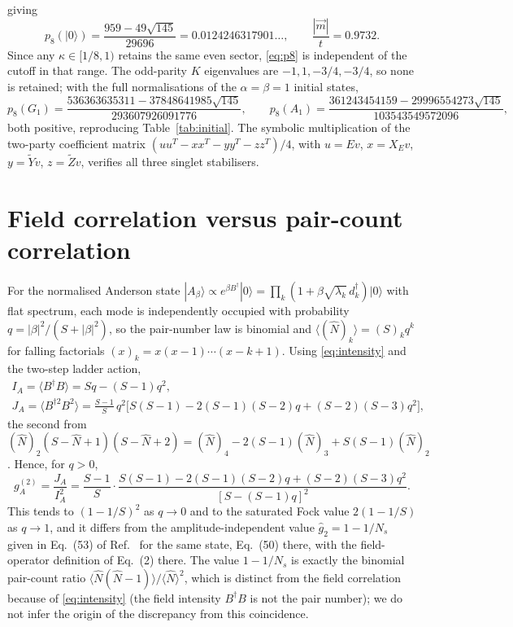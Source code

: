 \documentclass[11pt,a4paper]{article}
\newcommand{\ket}[1]{|#1\rangle}
\newcommand{\Zt}{\widetilde Z}
\newcommand{\Yt}{\widetilde Y}
\begin{document}
giving
\begin{equation}
p_8(\ket0)=\frac{959-49\sqrt{145}}{29696}=0.0124246317901\ldots,\qquad \frac{|\vec m|}{t}=0.9732 .
\label{eq:p8}
\end{equation}
Since any $\kappa\in[1/8,1)$ retains the same even sector, \eqref{eq:p8} is independent of the cutoff in that range. The odd-parity $K$ eigenvalues are $-1,1,-3/4,-3/4$, so none is retained; with the full normalisations of the $\alpha=\beta=1$ initial states,
\begin{equation}
p_8(G_1)=\frac{536363635311-37848641985\sqrt{145}}{293607926091776},\qquad
p_8(A_1)=\frac{361243454159-29996554273\sqrt{145}}{103543549572096},
\end{equation}
both positive, reproducing Table~\ref{tab:initial}. The symbolic multiplication of the two-party coefficient matrix $(uu^T-xx^T-yy^T-zz^T)/4$, with $u=Ev$, $x=X_Ev$, $y=\Yt v$, $z=\Zt v$, verifies all three singlet stabilisers.

\section{Field correlation versus pair-count correlation}
\label{app:g2}

For the normalised Anderson state $\ket{A_\beta}\propto e^{\beta B^\dagger}\ket0=\prod_k(1+\beta\sqrt{\lambda_k}\,d_k^\dagger)\ket0$ with flat spectrum, each mode is independently occupied with probability $q=|\beta|^2/(S+|\beta|^2)$, so the pair-number law is binomial and $\langle(\hat N)_k\rangle=(S)_kq^k$ for falling factorials $(x)_k=x(x-1)\cdots(x-k+1)$. Using \eqref{eq:intensity} and the two-step ladder action,
\begin{equation}
\begin{gathered}
I_A=\langle B^\dagger B\rangle=Sq-(S-1)q^2,\\
J_A=\langle B^{\dagger2}B^2\rangle=\frac{S-1}{S}\,q^2\big[S(S-1)-2(S-1)(S-2)q+(S-2)(S-3)q^2\big],
\end{gathered}
\end{equation}
the second from $(\hat N)_2(S-\hat N+1)(S-\hat N+2)=(\hat N)_4-2(S-1)(\hat N)_3+S(S-1)(\hat N)_2$. Hence, for $q>0$,
\begin{equation}
g^{(2)}_A=\frac{J_A}{I_A^2}=\frac{S-1}{S}\cdot\frac{S(S-1)-2(S-1)(S-2)q+(S-2)(S-3)q^2}{[S-(S-1)q]^2}.
\label{eq:g2A}
\end{equation}
This tends to $(1-1/S)^2$ as $q\to0$ and to the saturated Fock value $2(1-1/S)$ as $q\to1$, and it differs from the amplitude-independent value $\hat g_2=1-1/N_s$ given in Eq.~(53) of Ref.~\cite{Shiau2017} for the same state, Eq.~(50) there, with the field-operator definition of Eq.~(2) there. The value $1-1/N_s$ is exactly the binomial pair-count ratio $\langle\hat N(\hat N-1)\rangle/\langle\hat N\rangle^2$, which is distinct from the field correlation because of \eqref{eq:intensity} (the field intensity $B^\dagger B$ is not the pair number); we do not infer the origin of the discrepancy from this coincidence.
\end{document}
